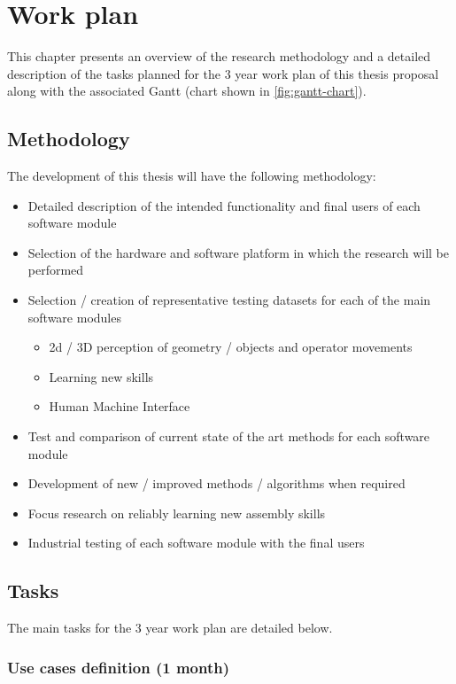 \chapter{Work plan}\label{chap:work-plan}

This chapter presents an overview of the research methodology and a detailed description of the tasks planned for the 3 year work plan of this thesis proposal along with the associated Gantt (chart shown in \cref{fig:gantt-chart}).


\section{Methodology}

The development of this thesis will have the following methodology:

\begin{itemize}
	\item Detailed description of the intended functionality and final users of each software module
	\item Selection of the hardware and software platform in which the research will be performed
	\item Selection / creation of representative testing datasets for each of the main software modules
	\begin{itemize}
		\item 2d / 3D perception of geometry / objects and operator movements
		\item Learning new skills
		\item Human Machine Interface
	\end{itemize}
	\item Test and comparison of current state of the art methods for each software module
	\item Development of new / improved methods / algorithms when required
	\item Focus research on reliably learning new assembly skills
	\item Industrial testing of each software module with the final users
\end{itemize}



\section{Tasks}

The main tasks for the 3 year work plan are detailed below.


\subsection{Use cases definition (1 month)}

